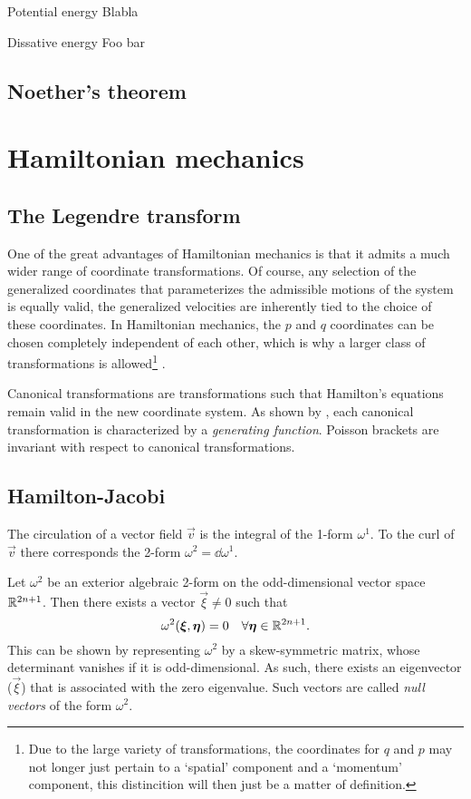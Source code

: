 \begin{econ}{Potential energy}
    Blabla
\end{econ}

\begin{econ}{Dissative energy}
    Foo bar
\end{econ}

\subsection{Noether's theorem}

\section{Hamiltonian mechanics}
\subsection{The Legendre transform}
One of the great advantages of Hamiltonian mechanics is that it admits a much wider range of coordinate transformations. Of course, any selection of the generalized coordinates that parameterizes the admissible motions of the system is equally valid, the generalized velocities are inherently tied to the choice of these coordinates. In Hamiltonian mechanics, the \(p\) and \(q\) coordinates can be chosen completely independent of each other, which is why a larger class of transformations is allowed\footnote{Due to the large variety of transformations, the coordinates for \(q\) and \(p\) may not longer just pertain to a `spatial' component and a `momentum' component, this distincition will then just be a matter of definition.} \cite{Landau1976}.

Canonical transformations are transformations such that Hamilton's equations remain valid in the new coordinate system. As shown by \citet{Landau1976}, each canonical transformation is characterized by a \emph{generating function}. Poisson brackets are invariant with respect to canonical transformations.

\subsection{Hamilton-Jacobi}
The circulation of a vector field \(\vec{v}\) is the integral of the 1-form \(\omega^1\). To the curl of \(\vec{v}\) there corresponds the 2-form \(\omega^2=\dd{\omega^1}\).

Let \(\omega^2\) be an exterior algebraic 2-form on the odd-dimensional vector space \(\mathbb{R}^{2n+ 1}\). Then there exists a vector \(\vec{\xi} \ne 0\) such that 
\[ \omega^2(\vb*{\xi}, \vb*{\eta}) = 0\quad \forall \vb*{\eta} \in \mathbb{R}^{2n+1}.  \]
This can be shown by representing \(\omega^2\) by a skew-symmetric matrix, whose determinant vanishes if it is odd-dimensional. As such, there exists an eigenvector (\(\vec{\xi}\)) that is associated with the zero eigenvalue. Such vectors are called \emph{null vectors} of the form \(\omega^2\).


